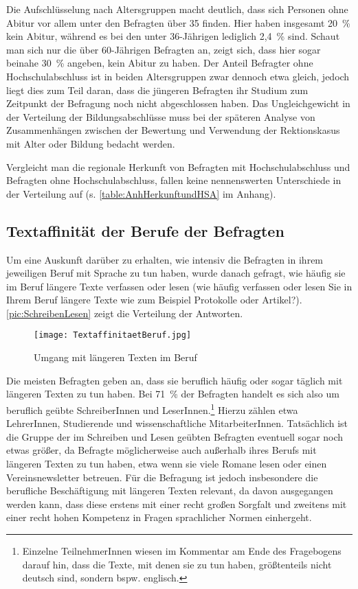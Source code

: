 Die Aufschlüsselung nach Altersgruppen macht deutlich, dass sich Personen ohne Abitur vor allem unter den Befragten über 35 finden. 
Hier haben insgesamt 20~\% kein Abitur, während es bei den unter 36-Jährigen lediglich 2,4~\% sind. 
Schaut man sich nur die über 60-Jährigen Befragten an, zeigt sich, dass hier sogar beinahe 30~\% angeben, kein Abitur zu haben. 
Der Anteil Befragter ohne Hochschulabschluss ist in beiden Altersgruppen zwar dennoch etwa gleich, jedoch liegt dies zum Teil daran, dass die jüngeren Befragten ihr Studium zum Zeitpunkt der Befragung noch nicht abgeschlossen haben.
Das Ungleichgewicht in der Verteilung der Bildungsabschlüsse muss bei der späteren Analyse von Zusammenhängen zwischen der Bewertung und Verwendung der Rektionskasus mit Alter oder Bildung bedacht werden. 

Vergleicht man die regionale Herkunft von Befragten mit Hochschulabschluss und Befragten ohne Hochschulabschluss, fallen keine nennenswerten Unterschiede in der Verteilung auf (s. \autoref{table:AnhHerkunftundHSA} im Anhang). 
\subsection{Textaffinität der Berufe der Befragten}
\label{sec:Beruf}
Um eine Auskunft darüber zu erhalten, wie intensiv die Befragten in ihrem jeweiligen Beruf mit Sprache zu tun haben, wurde danach gefragt, wie häufig sie im Beruf längere Texte verfassen oder lesen (\glqq wie häufig verfassen oder lesen Sie in Ihrem Beruf längere Texte wie zum Beispiel Protokolle oder Artikel?\grqq). 
\autoref{pic:SchreibenLesen} zeigt die Verteilung der Antworten. 
\begin{figure}
\centering
\texttt{[image: TextaffinitaetBeruf.jpg]}
\caption{Umgang mit längeren Texten im Beruf}
\label{pic:SchreibenLesen}
\end{figure}

Die meisten Befragten geben an, dass sie beruflich häufig oder sogar täglich mit längeren Texten zu tun haben.
Bei 71~\% der Befragten handelt es sich also um beruflich geübte SchreiberInnen und LeserInnen.\footnote{Einzelne TeilnehmerInnen wiesen im Kommentar am Ende des Fragebogens darauf hin, dass die Texte, mit denen sie zu tun haben, größtenteils nicht deutsch sind, sondern bspw. englisch.}
Hierzu zählen etwa LehrerInnen, Studierende und wissenschaftliche MitarbeiterInnen. 
Tatsächlich ist die Gruppe der im Schreiben und Lesen geübten Befragten eventuell sogar noch etwas größer, da Befragte möglicherweise auch außerhalb ihres Berufs mit längeren Texten zu tun haben, etwa wenn sie viele Romane lesen oder einen Vereinsnewsletter betreuen. 
Für die Befragung ist jedoch insbesondere die berufliche Beschäftigung mit längeren Texten relevant, da davon ausgegangen werden kann, dass diese erstens mit einer recht großen Sorgfalt und zweitens mit einer recht hohen Kompetenz in Fragen sprachlicher Normen einhergeht. 

